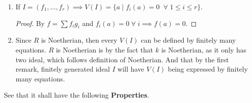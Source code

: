 \begin{remark}
	\leavevmode
	\begin{enumerate}
		\item If \( I = (f_1,\ldots, f_r)\implies V(I) = \{a \; | \; f_i (a) = 0 \; \; \forall \; 1 \leq
		      i \leq r\} \).
		      \begin{proof}
			      By \( f = \sum f_i g_i \) and \( f_i (a) = 0 \; \forall \; i \implies f(a) = 0 \).
		      \end{proof}
		\item Since \( R \) is Noetherian, then every \( V(I) \) can be defined by finitely many
		      equations. \( R \) is Noetherian is by the fact that \( k \) is Noetherian, as it only has
		      two ideal, which follows definition of Noetherian. And that by the first remark, finitely
		      generated ideal \( I \) will have \( V(I) \) being expressed by finitely many equations.
	\end{enumerate}
\end{remark}
See that it shall have the following \textbf{Properties}.

